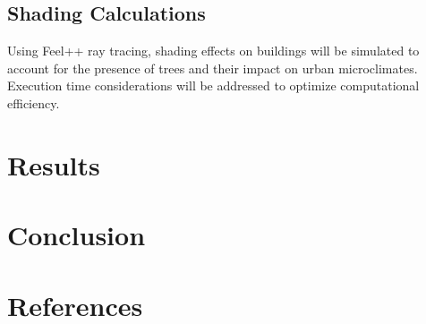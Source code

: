 \documentclass[12pt]{article}
\begin{document}
\subsection{Shading Calculations}
Using Feel++ ray tracing, shading effects on buildings will be simulated to account for the presence 
of trees and their impact on urban microclimates. Execution time considerations will be 
addressed to optimize computational efficiency.

\newpage

\section{Results}


\newpage

\section{Conclusion}


\newpage

\section{References}


\end{document}
